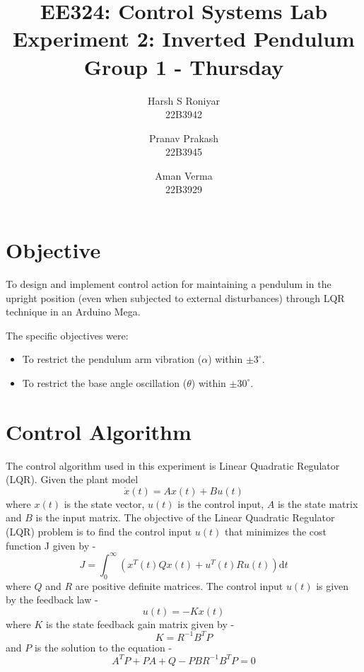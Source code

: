 \documentclass{article}
\title{EE324: Control Systems Lab \\ Experiment 2: Inverted Pendulum\\ \textbf{Group 1 - Thursday}}
\author{\large Harsh S Roniyar\\ \large 22B3942 \and \large Pranav Prakash\\ \large 22B3945 \and \large Aman Verma\\ \large 22B3929}
\begin{document}
\maketitle

\section{Objective}
To design and implement control action for maintaining a pendulum in the upright position (even when subjected to external disturbances) through LQR technique in an Arduino Mega.
\vspace{5pt}

The specific objectives were:
\begin{itemize}[noitemsep]
\item To restrict the pendulum arm vibration ($\alpha$) within $\pm 3^{\circ}$. 
\item To restrict the base angle oscillation ($\theta$) within $\pm 30^{\circ}$. 
\end{itemize}

\section{Control Algorithm}

The control algorithm used in this experiment is Linear Quadratic Regulator (LQR). 
Given the plant model
\begin{equation}
  \dot x(t) = Ax(t) + Bu(t)
\end{equation}
where $x(t)$ is the state vector, $u(t)$ is the control input, $A$ is the state matrix and $B$ is the input matrix. The objective of the Linear Quadratic Regulator (LQR) problem is to find the control input $u(t)$ that minimizes the cost function J given by - 
\begin{equation}
  J = \int_{0}^{\infty} (x^T(t)Qx(t) + u^T(t)Ru(t)) \text{d}t
\end{equation}  
where $Q$ and $R$ are positive definite matrices. The control input $u(t)$ is given by the feedback law -
\begin{equation}
  u(t) = -Kx(t)
\end{equation}
where $K$ is the state feedback gain matrix given by -
\begin{equation}
  K = R^{-1}B^TP
\end{equation}
and $P$ is the solution to the equation - %
\begin{equation}
  A^TP + PA + Q - PBR^{-1}B^TP = 0
\end{equation}
\end{document}
